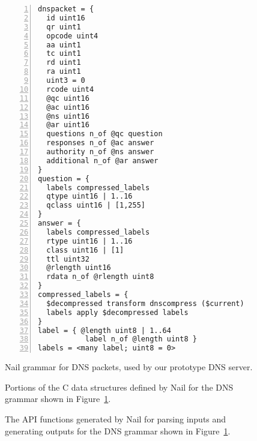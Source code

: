 \begin{figure}
\smaller[1.0]
\begin{Verbatim}[numbers=left]
dnspacket = {
  id uint16
  qr uint1
  opcode uint4
  aa uint1
  tc uint1
  rd uint1
  ra uint1
  uint3 = 0
  rcode uint4
  @qc uint16
  @ac uint16
  @ns uint16
  @ar uint16
  questions n_of @qc question
  responses n_of @ac answer
  authority n_of @ns answer
  additional n_of @ar answer
}
question = {
  labels compressed_labels
  qtype uint16 | 1..16
  qclass uint16 | [1,255]
}
answer = {
  labels compressed_labels
  rtype uint16 | 1..16
  class uint16 | [1]
  ttl uint32
  @rlength uint16
  rdata n_of @rlength uint8
}
compressed_labels = {
  $decompressed transform dnscompress ($current)
  labels apply $decompressed labels
}
label = { @length uint8 | 1..64
           label n_of @length uint8 }
labels = <many label; uint8 = 0>
\end{Verbatim}
\caption{Nail grammar for DNS packets, used by our prototype DNS server.}
\label{fig:dns-full}
\end{figure}

\begin{figure}
\smaller[1.0]

\caption{Portions of the C data structures defined by Nail for the DNS
  grammar shown in Figure~\ref{fig:dns-full}.}
\label{fig:dns-full-struct}
\end{figure}

\begin{figure}
\smaller[1.0]

\caption{The API functions generated by Nail for parsing inputs and
  generating outputs for the DNS grammar shown in Figure~\ref{fig:dns-full}.}
\label{fig:dns-full-api}
\end{figure}

